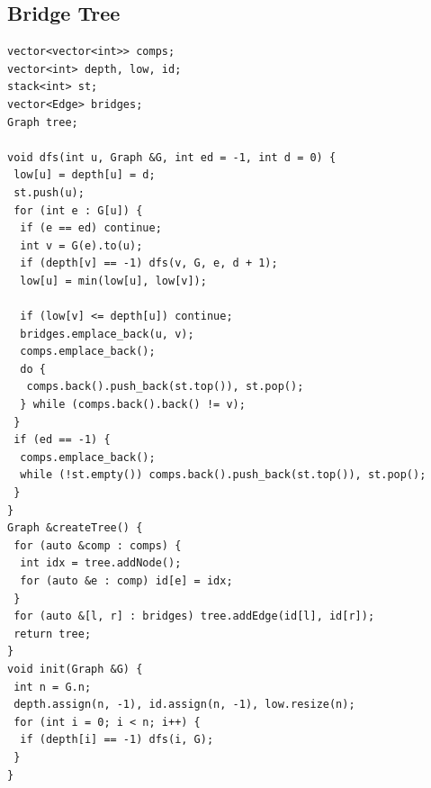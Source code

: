 \documentclass[a4paper,11pt,oneside]{article}
\begin{document}
\begin{multicols*}{\COLS}
\subsection{Bridge Tree}
\begin{lstlisting}
vector<vector<int>> comps;
vector<int> depth, low, id;
stack<int> st;
vector<Edge> bridges;
Graph tree;

void dfs(int u, Graph &G, int ed = -1, int d = 0) {
 low[u] = depth[u] = d;
 st.push(u);
 for (int e : G[u]) {
  if (e == ed) continue;
  int v = G(e).to(u);
  if (depth[v] == -1) dfs(v, G, e, d + 1);
  low[u] = min(low[u], low[v]);

  if (low[v] <= depth[u]) continue;
  bridges.emplace_back(u, v);
  comps.emplace_back();
  do {
   comps.back().push_back(st.top()), st.pop();
  } while (comps.back().back() != v);
 }
 if (ed == -1) {
  comps.emplace_back();
  while (!st.empty()) comps.back().push_back(st.top()), st.pop();
 }
}
Graph &createTree() {
 for (auto &comp : comps) {
  int idx = tree.addNode();
  for (auto &e : comp) id[e] = idx;
 }
 for (auto &[l, r] : bridges) tree.addEdge(id[l], id[r]);
 return tree;
}
void init(Graph &G) {
 int n = G.n;
 depth.assign(n, -1), id.assign(n, -1), low.resize(n);
 for (int i = 0; i < n; i++) {
  if (depth[i] == -1) dfs(i, G);
 }
}
\end{lstlisting}

\end{multicols*}
\end{document}
